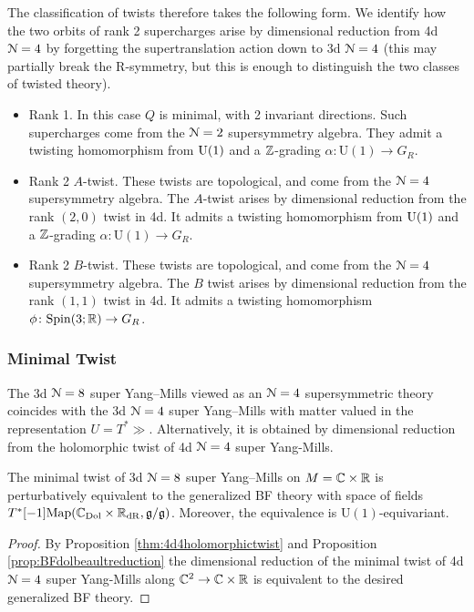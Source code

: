 \documentclass[10pt, oneside]{article}
\renewcommand{\U}{\mathrm{U}}
\begin{document}
The classification of twists therefore takes the following form.  We identify how the two orbits of rank 2 supercharges arise by dimensional reduction from 4d $\mathcal{N}=4$ by forgetting the supertranslation action down to 3d $\mathcal{N}=4$ (this may partially break the R-symmetry, but this is enough to distinguish the two classes of twisted theory).
\begin{itemize}
 \item Rank 1.  In this case $Q$ is minimal, with 2 invariant directions.  Such supercharges come from the $\mathcal{N}=2$ supersymmetry algebra.  They admit a twisting homomorphism from $\mathrm{U}(1)$ and a $\mathbb Z$-grading $\alpha \colon \U(1) \to G_R$.
 \item Rank 2 $A$-twist.  These twists are topological, and come from the $\mathcal{N}=4$ supersymmetry algebra.  The $A$-twist arises by dimensional reduction from the rank $(2,0)$ twist in 4d.  It admits a twisting homomorphism from $\mathrm{U}(1)$ and a $\mathbb Z$-grading $\alpha \colon \U(1) \to G_R$.
 \item Rank 2 $B$-twist.   These twists are topological, and come from the $\mathcal{N}=4$ supersymmetry algebra. The $B$ twist arises by dimensional reduction from the rank $(1,1)$ twist in 4d.  It admits a twisting homomorphism $\phi \colon \mathrm{Spin}(3;\mathbb R) \to G_R$.
\end{itemize}

\subsubsection{Minimal Twist}
\label{sect:3d8minimal_twist}
The 3d $\mathcal N=8$ super Yang--Mills viewed as an $\mathcal N=4$ supersymmetric theory coincides with the 3d $\mathcal N=4$ super Yang--Mills with matter valued in the representation $U = T^*\gg$.  
Alternatively, it is obtained by dimensional reduction from the holomorphic twist of 4d $\mathcal{N}=4$ super Yang-Mills.

\begin{theorem}  \label{3d_8_minimal_twist_thm}
The minimal twist of 3d $\mathcal N=8$ super Yang--Mills on $M=\mathbb C\times \mathbb R$ is perturbatively equivalent to the generalized BF theory with space of fields $T^*[-1]\mathrm{Map}(\mathbb C_{\rm Dol} \times \mathbb R_{\mathrm{dR}}, \mathfrak g/\mathfrak g)$. Moreover, the equivalence is $\U(1)$-equivariant.
\end{theorem}

\begin{proof}
By Proposition \ref{thm:4d4holomorphictwist} and Proposition \ref{prop:BFdolbeaultreduction} the dimensional reduction of the minimal twist of 4d $\mathcal N=4$ super Yang-Mills along $\mathbb C^2 \to \mathbb C \times \mathbb R$ is equivalent to the desired generalized BF theory.
\end{proof}
\end{document}
